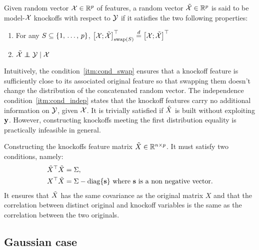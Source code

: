 \begin{definition}
    Given random vector $\mathcal{X} \in \mathbb{R}^p$ of features,
    a random vector $\tilde{\mathcal{X}} \in \mathbb{R}^p$ is said to be model-$\mathcal{X}$ knockoffs with respect to $\mathcal{Y}$
    if it satisfies the two following properties:
    \begin{enumerate}[label=\textbf{S.\arabic*},ref=S.\arabic*]
        \item \label{itm:cond_swap} For any $S \subseteq \left\{ 1,\, \dots,\, p \right\}$,
            $\big[ \mathcal{X}; \tilde{\mathcal{X}} \big]^\top_{\operatorname{swap}(S)} \stackrel{d}{=} \big[ \mathcal{X}; \tilde{\mathcal{X}} \big]^\top$
        \item \label{itm:cond_indep} $\tcX \independent \cY \mid \cX$
    \end{enumerate}
\end{definition}
Intuitively, the condition~\ref{itm:cond_swap} ensures that a knockoff feature is sufficiently
close to its associated original feature so that swapping them doesn't change the distribution of the
concatenated random vector.
The independence condition~\ref{itm:cond_indep} states that the knockoff features
carry no additional information on $\mathcal{Y}$, given $\mathcal{X}$.
It is trivially satisfied if $\tilde{X}$ is built without exploiting $\mathbf{y}$.
However, constructing knockoffs meeting the first distribution equality is practically infeasible in general.
\begin{remark}
    Constructing the knockoffs feature matrix $\tilde{X} \in \mathbb{R}^{n \times p}$.
    It must satisfy two conditions, namely:
    \begin{align*}
        &{\tilde{X}}^\top\tilde{X} = \Sigma,
        \\
        &X^\top\tilde{X} = \Sigma - \operatorname*{diag}\{\mathbf{s}\}
        \text{ where } \mathbf{s} \text{ is a non negative vector.}
    \end{align*}
    It ensures that $\tilde{X}$ has the same covariance as the original matrix $X$
    and that the correlation between distinct original and knockoff variables is
    the same as the correlation between the two originals.
\end{remark}

\subsection{Gaussian case}\label{subsec:gaussian_knockoffs}


